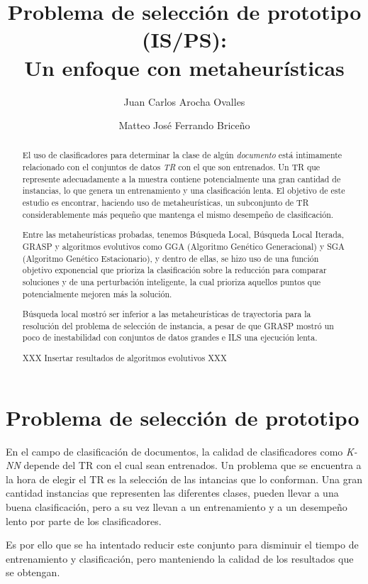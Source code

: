 \documentclass{ci5652}
\title{Problema de selección de prototipo (IS/PS):\\
       Un enfoque con metaheurísticas}
\author{Juan Carlos Arocha Ovalles
        \and
        Matteo José Ferrando Briceño}
\begin{document}
\thispagestyle{empty}
\maketitle


\begin{abstract}
El uso de clasificadores para determinar la clase de algún \textit{documento} está intimamente relacionado con el conjuntos de datos \textit{TR} con el que son entrenados. Un TR que represente adecuadamente a la muestra contiene potencialmente una gran cantidad de instancias, lo que genera un entrenamiento y una clasificación lenta. El objetivo de este estudio es encontrar, haciendo uso de metaheurísticas, un subconjunto de TR considerablemente más pequeño que mantenga el mismo desempeño de clasificación.

Entre las metaheurísticas probadas, tenemos Búsqueda Local, Búsqueda Local Iterada, GRASP y algoritmos evolutivos como GGA (Algoritmo Genético Generacional) y SGA (Algoritmo Genético Estacionario), y  dentro de ellas, se hizo uso de una función objetivo exponencial que prioriza la clasificación sobre la reducción para comparar soluciones y de una perturbación inteligente, la cual prioriza aquellos puntos que potencialmente mejoren más la solución.

Búsqueda local mostró ser inferior a las metaheurísticas de trayectoria para la resolución del problema de selección de instancia, a pesar de que GRASP mostró un poco de inestabilidad con conjuntos de datos grandes e ILS una ejecución lenta.

XXX Insertar resultados de algoritmos evolutivos XXX

\end{abstract}

\section{Problema de selección de prototipo}

En el campo de clasificación de documentos, la calidad de clasificadores como \textit{K-NN} depende del TR con el cual sean entrenados. Un problema que se encuentra a la hora de elegir el TR es la selección de las intancias que lo conforman. Una gran cantidad instancias que representen las diferentes clases, pueden llevar a una buena clasificación, pero a su vez llevan a un entrenamiento y a un desempeño lento por parte de los clasificadores.

Es por ello que se ha intentado reducir este conjunto para disminuir el tiempo de entrenamiento y clasificación, pero manteniendo la calidad de los resultados que se obtengan.
\end{document}
